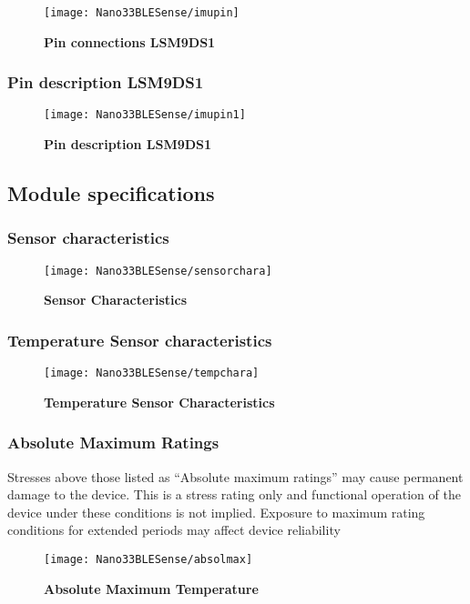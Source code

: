 \begin{figure}[h!]
    \centering	\texttt{[image: Nano33BLESense/imupin]}
    \caption{\textbf{Pin connections LSM9DS1}} \cite{STMicroelectronics:2015}
\end{figure}


\subsubsection{Pin description LSM9DS1}
\begin{figure}[h!]
    \centering	\texttt{[image: Nano33BLESense/imupin1]}
    \caption{\textbf{Pin description LSM9DS1}} \cite{STMicroelectronics:2015}
\end{figure}

\subsection{Module specifications}
\subsubsection{Sensor characteristics}
\begin{figure}[h!]
    \centering	\texttt{[image: Nano33BLESense/sensorchara]}
    \caption{\textbf{Sensor Characteristics}} \cite{STMicroelectronics:2015}
\end{figure}


\subsubsection{Temperature Sensor characteristics}
\begin{figure}[h!]
    \centering	\texttt{[image: Nano33BLESense/tempchara]}
    \caption{\textbf{Temperature Sensor Characteristics}} \cite{STMicroelectronics:2015}
\end{figure}

\subsubsection{Absolute Maximum Ratings}
Stresses above those listed as “Absolute maximum ratings” may cause permanent damage 
to the device. This is a stress rating only and functional operation of the device under these 
conditions is not implied. Exposure to maximum rating conditions for extended periods may 
affect device reliability

\begin{figure}[h!]
    \centering	\texttt{[image: Nano33BLESense/absolmax]}
    \caption{\textbf{Absolute Maximum Temperature }} \cite{STMicroelectronics:2015}
\end{figure}

